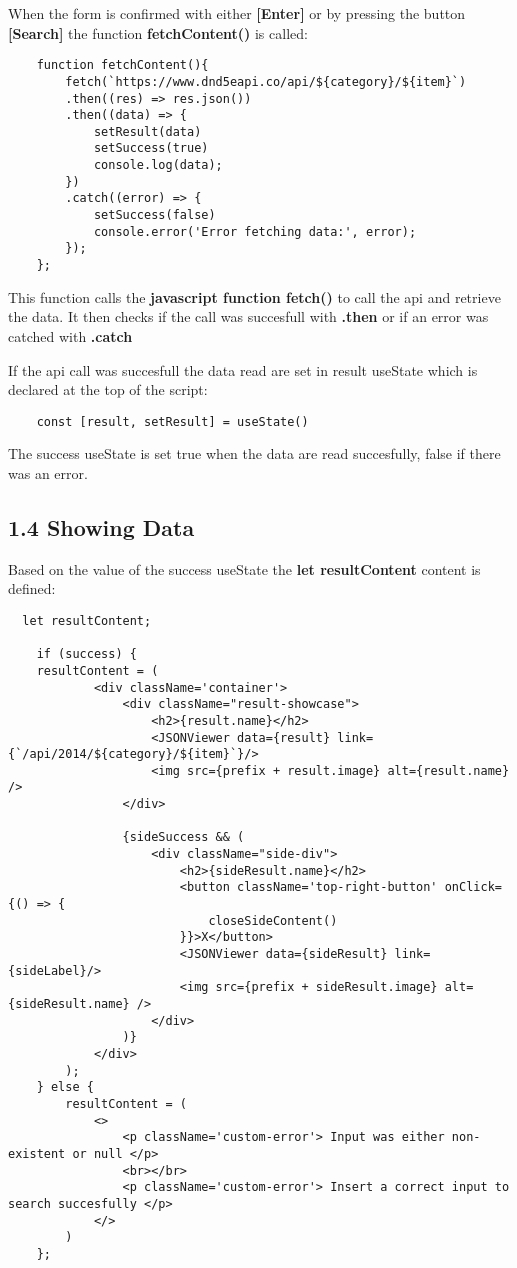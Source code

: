 \documentclass[
]{article}
\begin{document}
\begin{flushleft}
When the form is confirmed with either \textbf{[Enter]} or by pressing the button \textbf{[Search]} the function \textbf{fetchContent()} is called:

\begin{verbatim}
    function fetchContent(){
        fetch(`https://www.dnd5eapi.co/api/${category}/${item}`)
        .then((res) => res.json())
        .then((data) => {
            setResult(data)
            setSuccess(true)
            console.log(data);
        })
        .catch((error) => {
            setSuccess(false)
            console.error('Error fetching data:', error);
        });
    };
\end{verbatim}

This function calls the \textbf{javascript function fetch()} to call the api and retrieve the data.
It then checks if the call was succesfull with \textbf{.then} or if an error was catched with \textbf{.catch}

If the api call was succesfull the data read are set in result useState which is declared at the top of the script:

\begin{verbatim}
    const [result, setResult] = useState()
\end{verbatim}

The success useState is set true when the data are read succesfully, false if there was an error.

\subsection{1.4 Showing Data}\label{showing-data}

Based on the value of the success useState the \textbf{let resultContent} content is defined:

\begin{verbatim}
  let resultContent;

    if (success) {
    resultContent = (
            <div className='container'>
                <div className="result-showcase">
                    <h2>{result.name}</h2>
                    <JSONViewer data={result} link={`/api/2014/${category}/${item}`}/>
                    <img src={prefix + result.image} alt={result.name} />
                </div>

                {sideSuccess && (
                    <div className="side-div">
                        <h2>{sideResult.name}</h2>
                        <button className='top-right-button' onClick={() => {
                            closeSideContent()
                        }}>X</button>
                        <JSONViewer data={sideResult} link={sideLabel}/>
                        <img src={prefix + sideResult.image} alt={sideResult.name} />
                    </div>
                )}
            </div>
        );
    } else {
        resultContent = (
            <>
                <p className='custom-error'> Input was either non-existent or null </p>
                <br></br>
                <p className='custom-error'> Insert a correct input to search succesfully </p>
            </>
        )
    };
\end{verbatim}


\end{flushleft}
\end{document}
